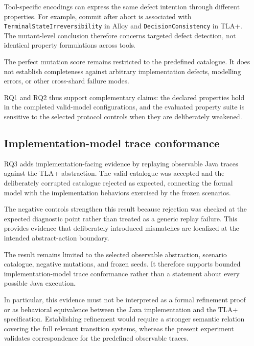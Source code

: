 Tool-specific encodings can express the same defect intention through different
properties. For example, commit after abort is associated with
\texttt{TerminalState\allowbreak Irreversibility} in Alloy and
\texttt{Decision\allowbreak Consistency} in TLA+. The mutant-level conclusion
therefore concerns targeted defect detection, not identical property
formulations across tools.

The perfect mutation score remains restricted to the predefined catalogue. It
does not establish completeness against arbitrary implementation defects,
modelling errors, or other cross-shard failure modes.

RQ1 and RQ2 thus support complementary claims: the declared properties hold in
the completed valid-model configurations, and the evaluated property suite is
sensitive to the selected protocol controls when they are deliberately
weakened.

\subsection{Implementation-model trace conformance}
\label{subsec:discussion-conformance}

RQ3 adds implementation-facing evidence by replaying observable Java traces
against the TLA+ abstraction. The valid catalogue was accepted and the
deliberately corrupted catalogue rejected as expected, connecting the formal
model with the implementation behaviors exercised by the frozen scenarios.

The negative controls strengthen this result because rejection was checked at
the expected diagnostic point rather than treated as a generic replay failure.
This provides evidence that deliberately introduced mismatches are localized at
the intended abstract-action boundary.

The result remains limited to the selected observable abstraction, scenario
catalogue, negative mutations, and frozen seeds. It therefore supports bounded
implementation-model trace conformance rather than a statement about every
possible Java execution.

In particular, this evidence must not be interpreted as a formal
refinement proof or as behavioral equivalence between the Java
implementation and the TLA+ specification. Establishing refinement
would require a stronger semantic relation covering the full relevant
transition systems, whereas the present experiment validates
correspondence for the predefined observable traces.

